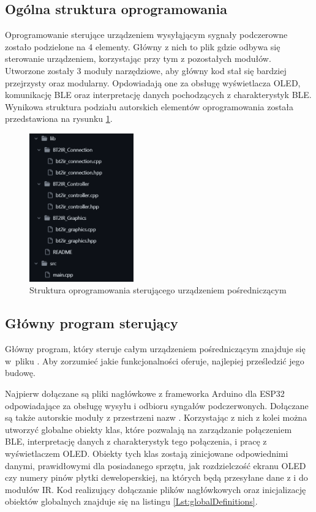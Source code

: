 \documentclass[12pt,twoside]{article}
\begin{document}
\subsection{Ogólna struktura oprogramowania}
Oprogramowanie sterujące urządzeniem wysyłąjącym sygnały podczerowne zostało podzielone na 4 elementy. Główny z nich to plik  gdzie odbywa się sterowanie urządzeniem, korzystając przy tym z pozostałych modułów. Utworzone zostały 3 moduły narzędziowe, aby główny kod stał się bardziej przejrzysty oraz modularny. Opdowiadają one za obsługę wyświetlacza OLED, komunikację BLE oraz interpretację danych pochodzących z charakterystyk BLE. Wynikowa struktura podziału autorskich elementów oprogramowania została przedstawiona na rysunku \ref*{Fig:codeStructure}.
\begin{figure}[ht]
   \centering
   \includegraphics[width=4.5cm]{images/codeStructure.png}
   \caption{Struktura oprogramowania sterującego urządzeniem pośredniczącym}
   \label{Fig:codeStructure}
\end{figure}

\subsection{Główny program sterujący}
Główny program, który steruje całym urządzeniem pośredniczącym znajduje się w~pliku . Aby zorzumieć jakie funkcjonalności oferuje, najlepiej prześledzić jego budowę.

Najpierw dołączane są pliki nagłówkowe z frameworka Arduino dla ESP32 odpowiadające za obsługę wysyłu i odbioru syngałów podczerwonych. Dołączane są także autorskie moduły z przestrzeni nazw . Korzystając z nich z kolei można utworzyć globalne obiekty klas, które pozwalają na zarządzanie połączeniem BLE, interpretację danych z charakterystyk tego połączenia, i pracę z  wyświetlaczem OLED. Obiekty tych klas zostają zinicjowane odpowiednimi danymi, prawidłowymi dla posiadanego sprzętu, jak rozdzielczość ekranu OLED czy numery pinów płytki deweloperskiej, na których będą przesyłane dane z i do modułów IR. Kod realizujący dołączanie plików nagłówkowych oraz inicjalizację obiektów globalnych znajduje się na listingu \ref{Lst:globalDefinitions}.
\end{document}
